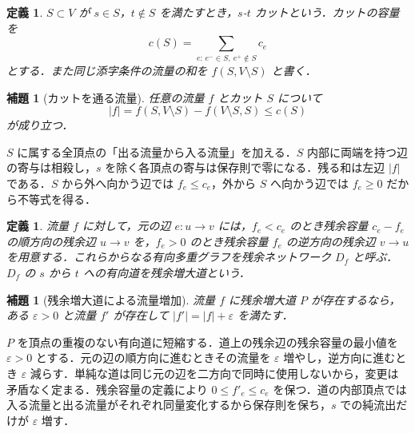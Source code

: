 \documentclass[a5paper,10pt,onecolumn]{jsarticle}
\makeatletter
\theoremstyle{mathnotetheorem}
\newtheorem{definition}[theorem]{定義}
\newtheorem{lemma}[theorem]{補題}
\renewcommand{\proofname}{証明}
\renewenvironment{proof}[1][\proofname]{%
  \par\pushQED{\qed}\normalfont\topsep4\p@\@plus2\p@\relax
  \trivlist\item[\hskip\labelsep\bfseries #1]\ignorespaces
}{\popQED\endtrivlist\@endpefalse}
\makeatother
\begin{document}
\begin{definition}
$S\subset V$ が $s\in S$，$t\notin S$ を満たすとき，$s$-$t$ \emph{カット}という．カットの容量を
\[
 c(S)=\sum_{e:\,e^-\in S,\ e^+\notin S}c_e
\]
とする．また同じ添字条件の流量の和を $f(S,V\setminus S)$ と書く．
\end{definition}
\begin{lemma}[カットを通る流量]\label{lem:cutidentity}
任意の流量 $f$ とカット $S$ について
\[
 |f|=f(S,V\setminus S)-f(V\setminus S,S)\le c(S)
\]
が成り立つ．
\end{lemma}
\begin{proof}
$S$ に属する全頂点の「出る流量から入る流量」を加える．$S$ 内部に両端を持つ辺の寄与は相殺し，$s$ を除く各頂点の寄与は保存則で零になる．残る和は左辺 $|f|$ である．$S$ から外へ向かう辺では $f_e\le c_e$，外から $S$ へ向かう辺では $f_e\ge0$ だから不等式を得る．
\end{proof}

\begin{definition}
流量 $f$ に対して，元の辺 $e:u\to v$ には，$f_e<c_e$ のとき残余容量 $c_e-f_e$ の\emph{順方向の残余辺} $u\to v$ を，$f_e>0$ のとき残余容量 $f_e$ の\emph{逆方向の残余辺} $v\to u$ を用意する．これらからなる有向多重グラフを残余ネットワーク $D_f$ と呼ぶ．$D_f$ の $s$ から $t$ への有向道を\emph{残余増大道}という．
\end{definition}
\begin{lemma}[残余増大道による流量増加]\label{lem:flowaugment}
流量 $f$ に残余増大道 $P$ が存在するなら，ある $\varepsilon>0$ と流量 $f'$ が存在して $|f'|=|f|+\varepsilon$ を満たす．
\end{lemma}
\begin{proof}
$P$ を頂点の重複のない有向道に短縮する．道上の残余辺の残余容量の最小値を $\varepsilon>0$ とする．元の辺の順方向に進むときその流量を $\varepsilon$ 増やし，逆方向に進むとき $\varepsilon$ 減らす．単純な道は同じ元の辺を二方向で同時に使用しないから，変更は矛盾なく定まる．残余容量の定義により $0\le f'_e\le c_e$ を保つ．道の内部頂点では入る流量と出る流量がそれぞれ同量変化するから保存則を保ち，$s$ での純流出だけが $\varepsilon$ 増す．
\end{proof}
\end{document}

